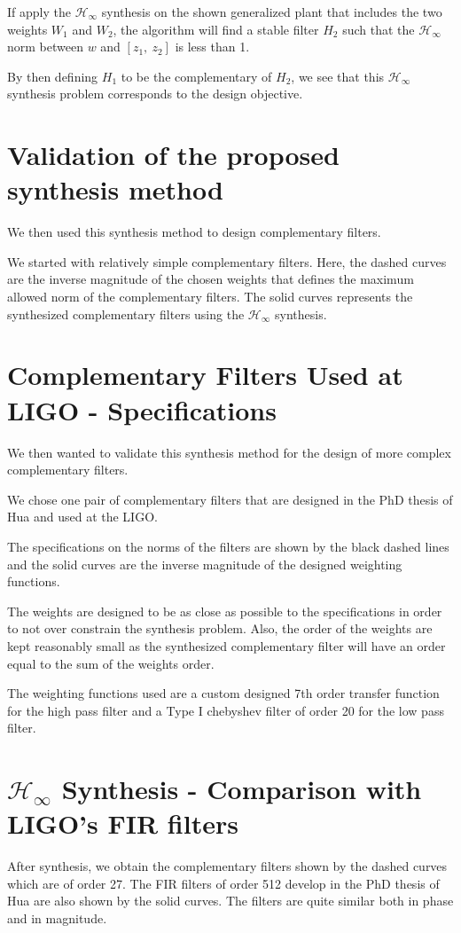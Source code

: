 \documentclass[hangsection=false, titlepage=false, tocnp=false]{cleanreport}
\begin{document}
If apply the \(\mathcal{H}_\infty\) synthesis on the shown generalized plant that includes the two weights \(W_1\) and \(W_2\), the algorithm will find a stable filter \(H_2\) such that the \(\mathcal{H}_\infty\) norm between \(w\) and \([z_1,\ z_2]\) is less than 1.

By then defining \(H_1\) to be the complementary of \(H_2\), we see that this \(\mathcal{H}_\infty\) synthesis problem corresponds to the design objective.

\section{Validation of the proposed synthesis method}
\label{sec:orgd012b55}
We then used this synthesis method to design complementary filters.

We started with relatively simple complementary filters.
Here, the dashed curves are the inverse magnitude of the chosen weights that defines the maximum allowed norm of the complementary filters.
The solid curves represents the synthesized complementary filters using the \(\mathcal{H}_\infty\) synthesis.

\section{Complementary Filters Used at LIGO - Specifications}
\label{sec:orgc32f967}
We then wanted to validate this synthesis method for the design of more complex complementary filters.

We chose one pair of complementary filters that are designed in the PhD thesis of Hua and used at the LIGO.

The specifications on the norms of the filters are shown by the black dashed lines and the solid curves are the inverse magnitude of the designed weighting functions.

The weights are designed to be as close as possible to the specifications in order to not over constrain the synthesis problem.
Also, the order of the weights are kept reasonably small as the synthesized complementary filter will have an order equal to the sum of the weights order.

The weighting functions used are a custom designed 7th order transfer function for the high pass filter and a Type I chebyshev filter of order 20 for the low pass filter.

\section{\(\mathcal{H}_\infty\) Synthesis - Comparison with LIGO's FIR filters}
\label{sec:orgdb88b2c}
After synthesis, we obtain the complementary filters shown by the dashed curves which are of order 27.
The FIR filters of order 512 develop in the PhD thesis of Hua are also shown by the solid curves.
The filters are quite similar both in phase and in magnitude.
\end{document}

